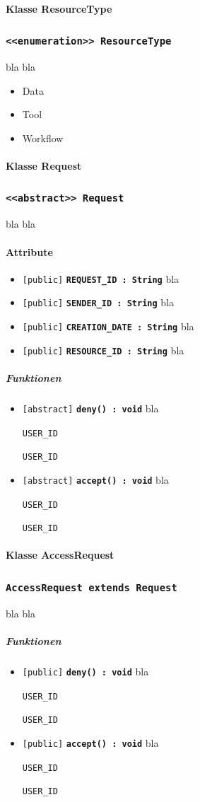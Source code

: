 \documentclass[parskip=full,11pt]{scrartcl}
\makeatletter
\newcommand{\lstInline}[2][,]{%
	\begingroup%
	\lstset{#1}%
	\begin{lrbox}{\mylisting}\lstinline!#2!\end{lrbox}%
	\setlength{\@tempdima}{\linegoal}%
	\ifdim\wd\mylisting>\@tempdima\hfill\\\fi%
	\lstinline!#2!%
	\endgroup%
}
\newcommand{\class}[1]{\subsubsection*{\lstinline[basicstyle=\ttfamily\large]{#1}}}
\newcommand{\atr}[4]{\lstinline{[#3]} \textbf{\lstinline{#1 : #2}} \newline #4}
\newcommand{\mtd}[5]{\lstinline{[#4]} \textbf{\lstinline{#1(#3) : #2}} \newline #5}
\newcommand{\inlinecode}[1]{\lstInline[breaklines=true]{#1}}
\makeatother
\begin{document}
  \paragraph*{Klasse ResourceType}
 \class{<<enumeration>> ResourceType}
 bla bla
 
\begin{itemize}
	\item{Data}
	\item{Tool}
	\item{Workflow}
	
\end{itemize}


  \paragraph*{Klasse Request}
 \class{<<abstract>> Request}
 bla bla
 
\paragraph*{Attribute} %
\begin{itemize}
	\item \atr{REQUEST_ID}{String}{public}{
	bla 
	}
		\item \atr{SENDER_ID}{String}{public}{
	bla 
	}
		\item \atr{CREATION_DATE}{String}{public}{
	bla 
	}
		\item \atr{RESOURCE_ID}{String}{public}{
	bla 
	}
\end{itemize}
\subparagraph*{Funktionen}  %
\begin{itemize}
	\item \mtd{deny}{void}{}{abstract}{
	bla  \inlinecode{USER_ID}
	}
	
	\item \mtd{accept}{void}{}{abstract}{
	bla  \inlinecode{USER_ID}
	}
\end{itemize}

  \paragraph*{Klasse AccessRequest}
 \class{AccessRequest extends Request}
 bla bla
 
\subparagraph*{Funktionen}  %
\begin{itemize}
	\item \mtd{deny}{void}{}{public}{
	bla  \inlinecode{USER_ID}
	}
	
	\item \mtd{accept}{void}{}{public}{
	bla  \inlinecode{USER_ID}
	}
\end{itemize}
\end{document}
